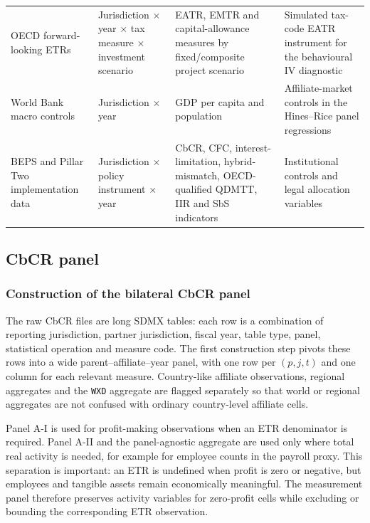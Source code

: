 \documentclass[11pt,a4paper]{article}
\newcommand{\code}[1]{\texttt{#1}}
\begin{document}
\begin{table}[H]
\begin{tabularx}{\textwidth}{@{}L{2.8cm}L{3.2cm}L{3.2cm}X@{}}
OECD forward-looking ETRs & Jurisdiction $\times$ year $\times$ tax measure $\times$ investment scenario & EATR, EMTR and capital-allowance measures by fixed/composite project scenario & Simulated tax-code EATR instrument for the behavioural IV diagnostic \\
World Bank macro controls & Jurisdiction $\times$ year & GDP per capita and population & Affiliate-market controls in the Hines--Rice panel regressions \\
BEPS and Pillar Two implementation data & Jurisdiction $\times$ policy instrument $\times$ year & CbCR, CFC, interest-limitation, hybrid-mismatch, OECD-qualified QDMTT, IIR and SbS indicators & Institutional controls and legal allocation variables \\
\bottomrule
\end{tabularx}
\end{table}

\subsection{CbCR panel}\label{app:CbCR}

\subsubsection{Construction of the bilateral CbCR panel}\label{sec:bilateral_panel}

The raw CbCR files are long SDMX tables: each row is a combination of reporting jurisdiction, partner jurisdiction, fiscal year, table type, panel, statistical operation and measure code. The first construction step pivots these rows into a wide parent--affiliate--year panel, with one row per $(p,j,t)$ and one column for each relevant measure. Country-like affiliate observations, regional aggregates and the \code{WXD} aggregate are flagged separately so that world or regional aggregates are not confused with ordinary country-level affiliate cells.

Panel A-I is used for profit-making observations when an ETR denominator is required. Panel A-II and the panel-agnostic aggregate are used only where total real activity is needed, for example for employee counts in the payroll proxy. This separation is important: an ETR is undefined when profit is zero or negative, but employees and tangible assets remain economically meaningful. The measurement panel therefore preserves activity variables for zero-profit cells while excluding or bounding the corresponding ETR observation. 
\end{document}

